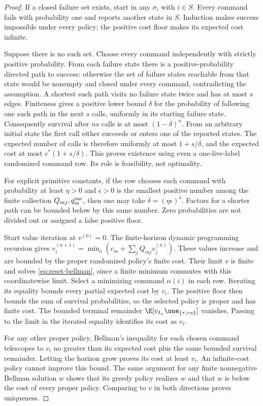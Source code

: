 \begin{proof}
If a closed failure set exists, start in any $\sigma_i$ with $i\in S$. Every command fails with probability one and reports another state in $S$. Induction makes success impossible under every policy; the positive cost floor makes its expected cost infinite.

Suppose there is no such set. Choose every command independently with strictly positive probability. From each failure state there is a positive-probability directed path to success: otherwise the set of failure states reachable from that state would be nonempty and closed under every command, contradicting the assumption. A shortest such path visits no failure state twice and has at most $s$ edges. Finiteness gives a positive lower bound $\delta$ for the probability of following one such path in the next $s$ calls, uniformly in its starting failure state. Consequently survival after $ns$ calls is at most $(1-\delta)^n$. From an arbitrary initial state the first call either succeeds or enters one of the reported states. The expected number of calls is therefore uniformly at most $1+s/\delta$, and the expected cost at most $c^*(1+s/\delta)$. This proves existence using even a one-live-label randomized command row. Its role is feasibility, not optimality.

For explicit primitive constants, if the row chooses each command with probability at least $\eta>0$ and $\epsilon>0$ is the smallest positive number among the finite collection $Q_{iaj},q_{ia}^{\rm suc}$, then one may take $\delta=(\eta\epsilon)^s$. Factors for a shorter path can be bounded below by this same number. Zero probabilities are not divided out or assigned a false positive floor.

Start value iteration at $v^{(0)}=0$. The finite-horizon dynamic programming recursion gives $v^{(n+1)}_i=\min_a(c_{ia}+\sum_jQ_{iaj}v^{(n)}_j)$. These values increase and are bounded by the proper randomized policy's finite cost. Their limit $v$ is finite and solves \eqref{eq:reset-bellman}, since a finite minimum commutes with this coordinatewise limit. Select a minimizing command $\alpha(i)$ in each row. Iterating its equality bounds every partial expected cost by $v_i$. The positive floor then bounds the sum of survival probabilities, so the selected policy is proper and has finite cost. The bounded terminal remainder $\E[v_{I_n}\one_{\{\tau>n\}}]$ vanishes. Passing to the limit in the iterated equality identifies its cost as $v_i$.

For any other proper policy, Bellman's inequality for each chosen command telescopes to $v_i$ no greater than its expected cost plus the same bounded survival remainder. Letting the horizon grow proves its cost at least $v_i$. An infinite-cost policy cannot improve this bound. The same argument for any finite nonnegative Bellman solution $w$ shows that its greedy policy realizes $w$ and that $w$ is below the cost of every proper policy. Comparing to $v$ in both directions proves uniqueness.


\end{proof}
